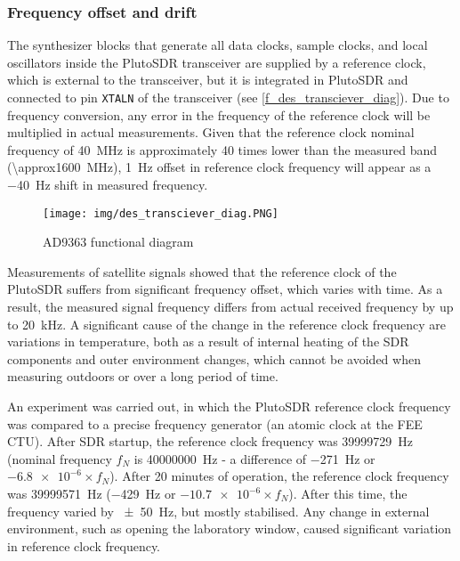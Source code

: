 \subsubsection{Frequency offset and drift}
\label{s_des_offset_drift}
The synthesizer blocks that generate all data clocks, sample clocks, and local oscillators inside the PlutoSDR transceiver are supplied by a reference clock, which is external to the transceiver, but it is integrated in PlutoSDR and connected to pin \texttt{XTALN} of the transceiver (see \autoref{f_des_transciever_diag})\cite{des07}. Due to frequency conversion, any error in the frequency of the reference clock will be multiplied in actual measurements. Given that the reference clock nominal frequency of \qty{40}{MHz} is approximately 40 times lower than the measured band (\qty{\approx1600}{MHz}), \qty{1}{Hz} offset in reference clock frequency will appear as a \qty{-40}{Hz} shift in measured frequency.

\begin{figure}
    \centering
    \texttt{[image: img/des\_transciever\_diag.PNG]}
    \caption{AD9363 functional diagram\cite{des07}}
    \label{f_des_transciever_diag}
\end{figure}

Measurements of satellite signals showed that the reference clock of the PlutoSDR suffers from significant frequency offset, which varies with time. As a result, the measured signal frequency differs from actual received frequency by up to \qty{20}{kHz}. A significant cause of the change in the reference clock frequency are variations in temperature, both as a result of internal heating of the SDR components and outer environment changes, which cannot be avoided when measuring outdoors or over a long period of time.

An experiment was carried out, in which the PlutoSDR reference clock frequency was compared to a precise frequency generator (an atomic clock at the FEE CTU). After SDR startup, the reference clock frequency was \qty{39999729}{Hz} (nominal frequency  $f_N$ is \qty{40000000}{Hz} - a difference of \qty{-271}{Hz} or $\num{-6.8e-6} \times f_N$). After 20 minutes of operation, the reference clock frequency was  \qty{39999571}{Hz} (\qty{-429}{Hz} or $\num{-10.7e-6} \times f_N$). After this time, the frequency varied by \qty{\pm 50}{Hz}, but mostly stabilised. Any change in external environment, such as opening the laboratory window, caused significant variation in reference clock frequency.

